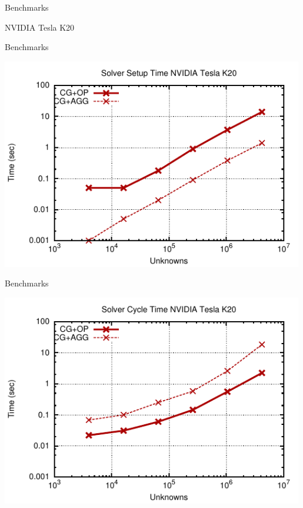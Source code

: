 \begin{frame}{Benchmarks}
  \begin{center}
   NVIDIA Tesla K20
  \end{center}
\end{frame}
\begin{frame}{Benchmarks}
  \begin{center}
   \includegraphics[width=0.99\textwidth]{figures/k20-setup.pdf}
  \end{center}
\end{frame}
\begin{frame}{Benchmarks}
  \begin{center}
   \includegraphics[width=0.99\textwidth]{figures/k20-cycle.pdf}
  \end{center}
\end{frame}
